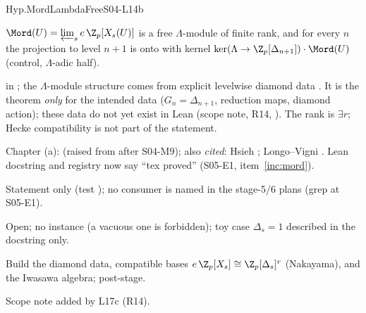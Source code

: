 \begin{hypentry}{Hyp.MordLambdaFree}{\kindinfra}{S04-L14b}
\item[Statement] $\Mord(U)=\varprojlim_s e\,\Z_p[X_s(U)]$ is a free $\Lambda$-module of finite rank, and for every $n$
  the projection to level $n+1$ is onto with kernel $\ker(\Lambda\to\Z_p[\Delta_{n+1}])\cdot\Mord(U)$
  (control, $\Lambda$-adic half).
\item[Lean]  in ; the $\Lambda$-module structure
  comes from explicit levelwise diamond data . It is the theorem \emph{only} for the intended data
  ($G_n=\Delta_{n+1}$, reduction maps, diamond action); these data do not yet exist in Lean (scope note, R14,
  ). The rank is $\exists r$; Hecke compatibility is not part of the statement.
\item[Source] Chapter (a): \stproved{} (raised from \stpmc{} after S04-M9); also
  \emph{cited}: Hsieh \cite[Thm.~4.2]{Hs}; Longo--Vigni \cite[Prop.~3.6]{LV11}. Lean docstring and registry now say ``tex proved'' (S05-E1, item~\ref{inc:mord}).
\item[Used by] Statement only (test ); no consumer is named in the stage-5/6 plans (grep at S05-E1).
\item[Status] Open; no instance (a vacuous one is forbidden); toy case $\Delta_s=1$ described in the docstring only.
\item[Discharge] Build the diamond data, compatible bases $e\,\Z_p[X_s]\cong\Z_p[\Delta_s]^r$ (Nakayama), and the
  Iwasawa algebra; post-stage.
\item[History] Scope note added by L17c (R14).
\end{hypentry}

